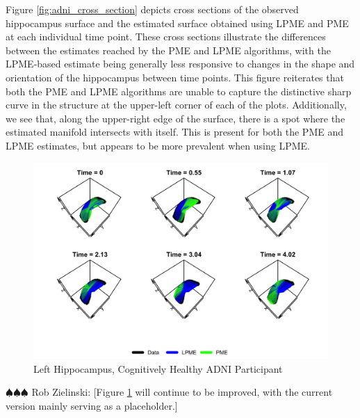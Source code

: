 \documentclass[11pt,reqno]{article}
\renewcommand{\textwidth}{180mm}
\newcommand{\zielinski}[1]{{\color{blue} \sf $\spadesuit\spadesuit\spadesuit$ Rob Zielinski: [#1]}}
\theoremstyle{definition}
\begin{document}
Figure \ref{fig:adni_cross_section} depicts cross sections of the observed hippocampus surface and the estimated surface obtained using LPME and PME at each individual time point. These cross sections illustrate the differences between the estimates reached by the PME and LPME algorithms, with the LPME-based estimate being generally less responsive to changes in the shape and orientation of the hippocampus between time points. This figure reiterates that both the PME and LPME algorithms are unable to capture the distinctive sharp curve in the structure at the upper-left corner of each of the plots. Additionally, we see that, along the upper-right edge of the surface, there is a spot where the estimated manifold intersects with itself. This is present for both the PME and LPME estimates, but appears to be more prevalent when using LPME.


\begin{figure}[h]
  \centering
  \includegraphics[width=\textwidth]{adni_lhipp}
  \caption{Left Hippocampus, Cognitively Healthy ADNI Participant}
  \label{fig:adni_result}
\end{figure}

\zielinski{Figure \ref{fig:adni_result} will continue to be improved, with the current version mainly serving as a placeholder.}
\end{document}
